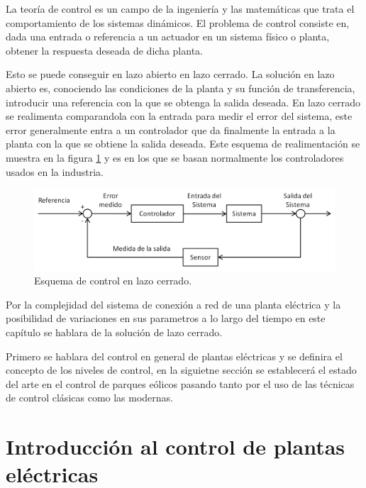 \documentclass{book}
\begin{document}
La teor\'ia de control es un campo de la ingenier\'ia y las matem\'aticas que trata el comportamiento de los sistemas din\'amicos. El problema de control consiste en, dada una entrada o referencia a un actuador en un sistema f\'isico o planta, obtener la respuesta deseada de dicha planta. \par

Esto se puede conseguir en lazo abierto en lazo cerrado. La solución en lazo abierto es, conociendo las condiciones de la planta y su funci\'on de transferencia, introducir una referencia con la que se obtenga la salida deseada. En lazo cerrado se realimenta comparandola con la entrada para medir el error del sistema, este error generalmente entra a un controlador que da finalmente la entrada a la planta con la que se obtiene la salida deseada. Este esquema de realimentaci\'on se muestra en la figura \ref{FeedBackLoop} y es en los que se basan normalmente los controladores usados en la industria. \par

\begin{figure}[h!]
\centering
\includegraphics[width=1\textwidth]{Realimentacion.PNG}
\caption{Esquema de control en lazo cerrado.}
\label{FeedBackLoop}
\end{figure}

Por la complejidad del sistema de conexi\'on a red de una planta el\'ectrica y la posibilidad de variaciones en sus parametros a lo largo del tiempo en este cap\'itulo se hablara de la soluci\'on de lazo cerrado. \par

 Primero se hablara del control en general de plantas el\'ectricas y se definira el concepto de los niveles de control, en la siguietne secci\'on se establecer\'a el estado del arte en el control de parques e\'olicos pasando tanto por el uso de las t\'ecnicas de control cl\'asicas como las modernas. \par 

	\section{Introducci\'on al control de plantas el\'ectricas}
\end{document}
